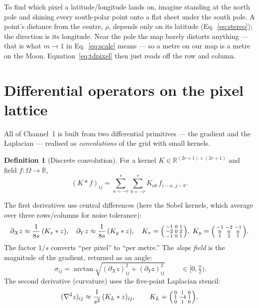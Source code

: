 \documentclass[11pt]{article}
\theoremstyle{definition}
\newtheorem{definition}{Definition}[section]
\newcommand{\R}{\mathbb{R}}
\newcommand{\lap}{\nabla^2}
\newcommand{\conv}{\mathbin{\ast}}
\begin{document}
\begin{words}
To find which pixel a latitude/longitude lands on, imagine standing at the north
pole and shining every south-polar point onto a flat sheet under the south pole.
A point's distance from the centre, $\rho$, depends only on its latitude
(Eq.~\ref{eq:stereo}); the direction is its longitude. Near the pole the map barely
distorts anything --- that is what $m\to1$ in Eq.~\eqref{eq:scale} means --- so a
metre on our map is a metre on the Moon. Equation~\eqref{eq:tdpixel} then just reads
off the row and column.
\end{words}

\section{Differential operators on the pixel lattice}

All of Channel~1 is built from two differential primitives --- the gradient and the
Laplacian --- realised as \emph{convolutions} of the grid with small kernels.

\begin{definition}[Discrete convolution]
For a kernel $K\in\R^{(2r+1)\times(2r+1)}$ and field $f:\Omega\to\R$,
\begin{equation}
(K\conv f)_{ij}=\sum_{a=-r}^{r}\sum_{b=-r}^{r}K_{ab}\,f_{i-a,\,j-b}.
\end{equation}
\end{definition}

The first derivatives use central differences (here the Sobel kernels, which average
over three rows/columns for noise tolerance):
\begin{equation}
\partial_X z \approx \frac{1}{8s}\,(K_x\conv z),\quad
\partial_Y z \approx \frac{1}{8s}\,(K_y\conv z),\quad
K_x=\begin{psmallmatrix}-1&0&1\\-2&0&2\\-1&0&1\end{psmallmatrix},\;
K_y=\begin{psmallmatrix}-1&-2&-1\\0&0&0\\1&2&1\end{psmallmatrix}.
\end{equation}
The factor $1/s$ converts ``per pixel'' to ``per metre.'' The \emph{slope field} is the
magnitude of the gradient, returned as an angle:
\begin{equation}
\boxed{\;\sigma_{ij}=\arctan\sqrt{(\partial_X z)_{ij}^2+(\partial_Y z)_{ij}^2}\;}\qquad\in[0,\tfrac{\pi}{2}).
\label{eq:slope}
\end{equation}
The second derivative (curvature) uses the five-point Laplacian stencil:
\begin{equation}
(\lap z)_{ij}\approx\frac{1}{s^2}\,(K_L\conv z)_{ij},\qquad
K_L=\begin{psmallmatrix}0&1&0\\1&-4&1\\0&1&0\end{psmallmatrix}.
\label{eq:lap}
\end{equation}
\end{document}
